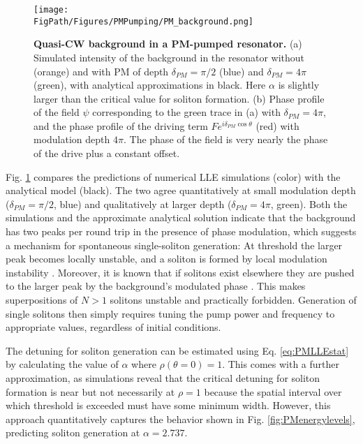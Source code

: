\begin{figure}[htpb]
	\begin{center}
		\texttt{[image: \\FigPath/Figures/PMPumping/PM\_background.png]}
	\end{center}
	\caption[Quasi-CW background in a PM-pumped resonator]{\textbf{Quasi-CW background in a PM-pumped resonator.} (a) Simulated intensity of the background in the resonator without (orange) and with PM of depth $\delta_{PM}=\pi/2$ (blue) and $\delta_{PM}=4\pi$ (green), with analytical approximations in black. Here $\alpha$ is slightly larger than the critical value for soliton formation. (b) Phase profile of the field $\psi$ corresponding to the green trace in (a) with $\delta_{PM}=4\pi$, and the phase profile of the driving term $Fe^{i\delta_{PM}\cos{\theta}}$ (red) with modulation depth $4\pi$. The phase of the field is very nearly the phase of the drive plus a constant offset.}
	\label{fig:PMbackground}
\end{figure} 


Fig. \ref{fig:PMbackground} compares the predictions of numerical LLE simulations (color) with the analytical model (black). The two agree quantitatively at small modulation depth ($\delta_{PM}=\pi/2$, blue) and qualitatively at larger depth ($\delta_{PM}=4\pi$, green). Both the simulations and the approximate analytical solution indicate that the background has two peaks per round trip in the presence of phase modulation, which suggests a mechanism for spontaneous single-soliton generation:  At threshold the larger peak becomes locally unstable, and a soliton is formed by local modulation instability \cite{Ceoldo2016,Wang2018}. Moreover, it is known that if solitons exist elsewhere they are pushed to the larger peak by the background’s modulated phase \cite{Jang2015a}. This makes superpositions of $N>1$ solitons unstable and practically forbidden. Generation of single solitons then simply requires tuning the pump power and frequency to appropriate values, regardless of initial conditions. 

The detuning for soliton generation can be estimated using Eq. \ref{eq:PMLLEstat} by calculating the value of $\alpha$ where $\rho(\theta=0)=1$. This comes with a further approximation, as simulations reveal that the critical detuning for soliton formation is near but not necessarily at $\rho=1$ because the spatial interval over which threshold is exceeded must have some minimum width. However, this approach quantitatively captures the behavior shown in Fig. \ref{fig:PMenergylevels}, predicting soliton generation at $\alpha=2.737$.

